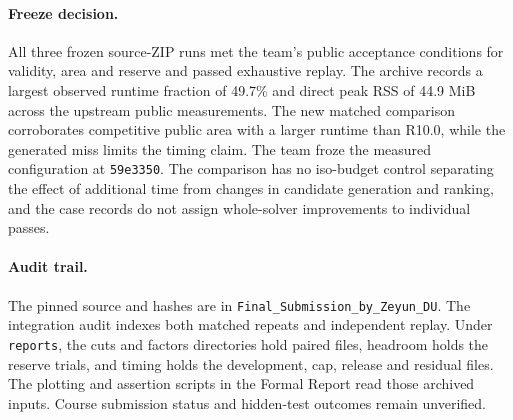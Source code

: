 \paragraph{Freeze decision.} All three frozen source-ZIP runs met the team's public acceptance conditions for validity, area and reserve and passed exhaustive replay. The archive records a largest observed runtime fraction of 49.7\% and direct peak RSS of 44.9 MiB across the upstream public measurements. The new matched comparison corroborates competitive public area with a larger runtime than R10.0, while the generated miss limits the timing claim. The team froze the measured configuration at \texttt{59e3350}. The comparison has no iso-budget control separating the effect of additional time from changes in candidate generation and ranking, and the case records do not assign whole-solver improvements to individual passes.

\paragraph{Audit trail.} The pinned source and hashes are in \texttt{Final\_Submission\_by\_Zeyun\_DU}. The integration audit indexes both matched repeats and independent replay. Under \texttt{reports}, the cuts and factors directories hold paired files, headroom holds the reserve trials, and timing holds the development, cap, release and residual files. The plotting and assertion scripts in the Formal Report read those archived inputs. Course submission status and hidden-test outcomes remain unverified.
